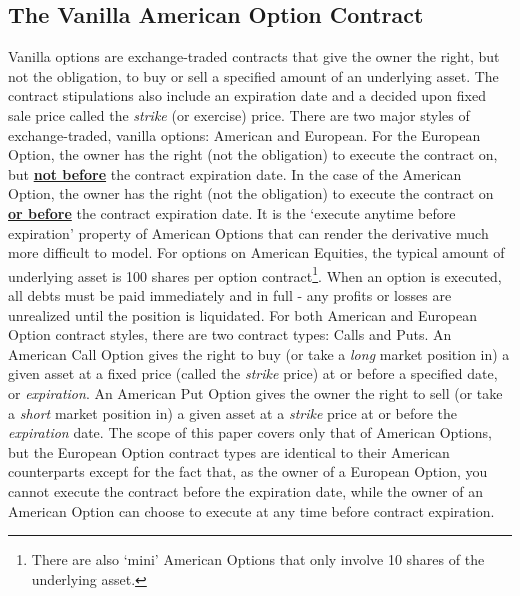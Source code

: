 \documentclass[12pt, a4paper, notitlepage]{article}
\numberwithin{equation}{subsection}
\numberwithin{figure}{subsection}
\numberwithin{table}{subsection}
\newcommand{\newpar}{\newline \newline}
\begin{document}
\subsection{The Vanilla American Option Contract}
Vanilla options are exchange-traded contracts that give the owner the right, but not the obligation, to buy or sell a specified amount of an underlying asset.  The contract stipulations also include an expiration date and a decided upon fixed sale price called the \textit{strike} (or exercise) price.  There are two major styles of exchange-traded, vanilla options:  American and European.  For the European Option, the owner has the right (not the obligation) to execute the contract on, but \underline{\textbf{not before}} the contract expiration date.  In the case of the American Option, the owner has the right (not the obligation) to execute the contract on \underline{\textbf{or before}} the contract expiration date.  It is the `execute anytime before expiration' property of American Options that can render the derivative much more difficult to model.  For options on American Equities, the typical amount of underlying asset is 100 shares per option contract\footnote{There are also `mini' American Options that only involve 10 shares of the underlying asset.}.  When an option is executed, all debts must be paid immediately and in full - any profits or losses are unrealized until the position is liquidated.
\newpar
For both American and European Option contract styles, there are two contract types: Calls and Puts.  An American Call Option gives the right to buy (or take a \textit{long} market position in) a given asset at a fixed price (called the \textit{strike} price) at or before a specified date, or \textit{expiration}.  An American Put Option gives the owner the right to sell (or take a \textit{short} market position in) a given asset at a \textit{strike} price at or before the \textit{expiration} date.  The scope of this paper covers only that of American Options, but the European Option contract types are identical to their American counterparts except for the fact that, as the owner of a European Option, you cannot execute the contract before the expiration date, while the owner of an American Option can choose to execute at any time before contract expiration.
\newpar
\end{document}
